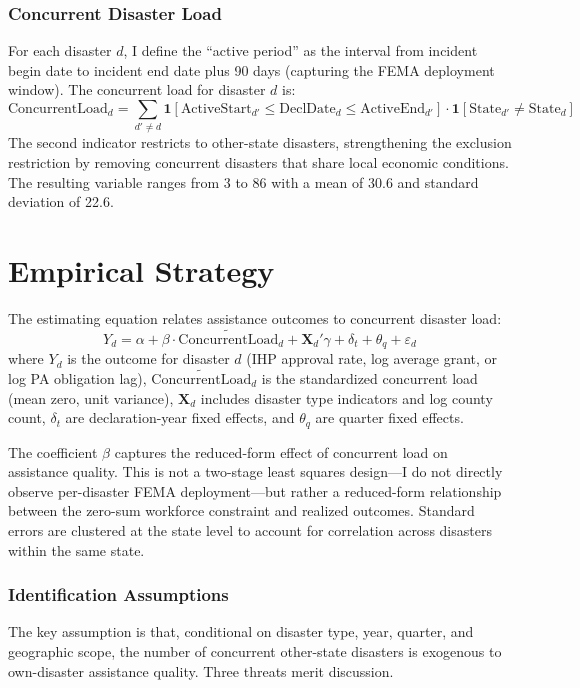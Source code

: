 \documentclass[12pt]{article}
\begin{document}
\subsubsection*{Concurrent Disaster Load} For each disaster $d$, I define the ``active period'' as the interval from incident begin date to incident end date plus 90 days (capturing the FEMA deployment window). The concurrent load for disaster $d$ is:
\begin{equation}
\text{ConcurrentLoad}_d = \sum_{d' \neq d} \mathbf{1}\left[\text{ActiveStart}_{d'} \leq \text{DeclDate}_d \leq \text{ActiveEnd}_{d'}\right] \cdot \mathbf{1}\left[\text{State}_{d'} \neq \text{State}_d\right]
\end{equation}
The second indicator restricts to other-state disasters, strengthening the exclusion restriction by removing concurrent disasters that share local economic conditions. The resulting variable ranges from 3 to 86 with a mean of 30.6 and standard deviation of 22.6.



\section{Empirical Strategy}

The estimating equation relates assistance outcomes to concurrent disaster load:
\begin{equation}
Y_d = \alpha + \beta \cdot \widetilde{\text{ConcurrentLoad}}_d + \mathbf{X}_d'\gamma + \delta_t + \theta_q + \varepsilon_d
\end{equation}
where $Y_d$ is the outcome for disaster $d$ (IHP approval rate, log average grant, or log PA obligation lag), $\widetilde{\text{ConcurrentLoad}}_d$ is the standardized concurrent load (mean zero, unit variance), $\mathbf{X}_d$ includes disaster type indicators and log county count, $\delta_t$ are declaration-year fixed effects, and $\theta_q$ are quarter fixed effects.

The coefficient $\beta$ captures the reduced-form effect of concurrent load on assistance quality. This is not a two-stage least squares design---I do not directly observe per-disaster FEMA deployment---but rather a reduced-form relationship between the zero-sum workforce constraint and realized outcomes. Standard errors are clustered at the state level to account for correlation across disasters within the same state.

\subsubsection*{Identification Assumptions} The key assumption is that, conditional on disaster type, year, quarter, and geographic scope, the number of concurrent other-state disasters is exogenous to own-disaster assistance quality. Three threats merit discussion.
\end{document}
